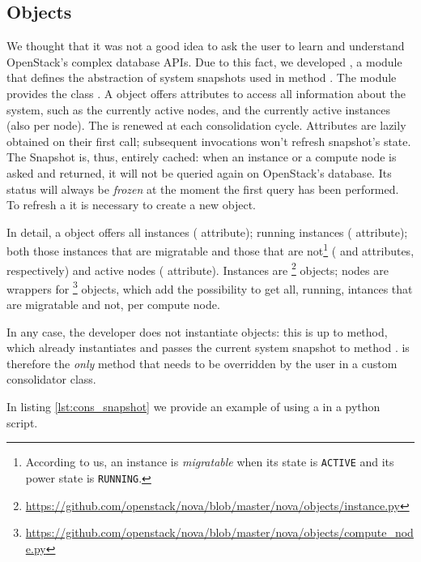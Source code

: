 \subsection{Objects}
\label{sub:cons_obj}
We thought that it was not a good idea to ask the user to learn and understand OpenStack's complex database APIs.
Due to this fact, we developed , a module that defines the abstraction of system snapshots used in method . The module provides the class . A  object offers attributes to access all information about the system, such as the currently active nodes, and the currently active instances (also per node). The  is renewed at each consolidation cycle. Attributes are lazily obtained on their first call; subsequent invocations won't refresh snapshot's state. The Snapshot is, thus, entirely cached: when an instance or a compute node is asked and returned, it will not be queried again on OpenStack's database. Its status will always be \emph{frozen} at the moment the first query has been performed. To refresh a  it is necessary to create a new  object.

In detail, a  object offers all instances ( attribute); running instances ( attribute); both those instances that are migratable and those that are not\footnote{According to us, an instance is \emph{migratable} when its state is \texttt{ACTIVE} and its power state is \texttt{RUNNING}.} ( and  attributes, respectively) and active nodes ( attribute). Instances are \footnote{\url{https://github.com/openstack/nova/blob/master/nova/objects/instance.py}} objects; nodes are wrappers for \footnote{\url{https://github.com/openstack/nova/blob/master/nova/objects/compute_node.py}} objects, which add the possibility to get all, running, intances that are migratable and not, per compute node.

In any case, the developer does not instantiate  objects: this is up to  method, which already instantiates and passes the current system snapshot to method .  is therefore the \emph{only} method that needs to be overridden by the user in a custom consolidator class.

In listing \ref{lst:cons_snapshot} we provide an example of using a  in a python script.

